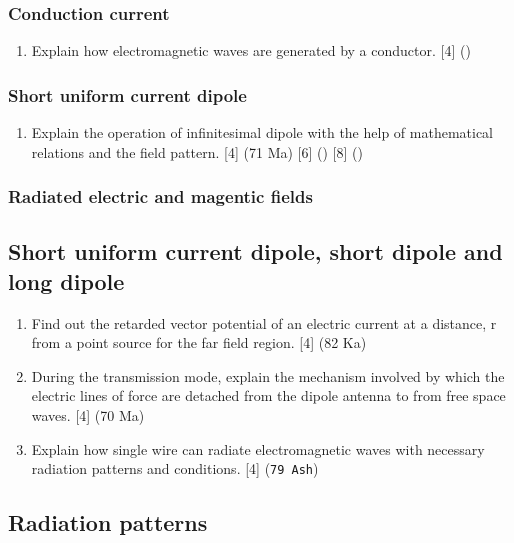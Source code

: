 \documentclass[12pt]{article}
\begin{document}
    \subsubsection{Conduction current}
      \begin{enumerate}
        \item Explain how electromagnetic waves are generated by a conductor. \hfill [4] ()
      \end{enumerate}

    \subsubsection{Short uniform current dipole}
      \begin{enumerate}
        \item Explain the operation of infinitesimal dipole with the help of mathematical relations and the field pattern. \hfill [4] (71 Ma) [6] () [8] ()
      \end{enumerate}

    \subsubsection{Radiated electric and magentic fields}

  \subsection{Short uniform current dipole, short dipole and long dipole}
    \begin{enumerate}
      \item Find out the retarded vector potential of an electric current at a distance, r from a point source for the far field region. \hfill [4] (82 Ka)

      \item During the transmission mode, explain the mechanism involved by which the electric lines of force are detached from the dipole antenna to from free space waves. \hfill [4] (70 Ma)

      \item Explain how single wire can radiate electromagnetic waves with necessary radiation patterns and conditions. \hfill [4] (\texttt{79 Ash})
    \end{enumerate}

    \subsection{Radiation patterns}
\end{document}
